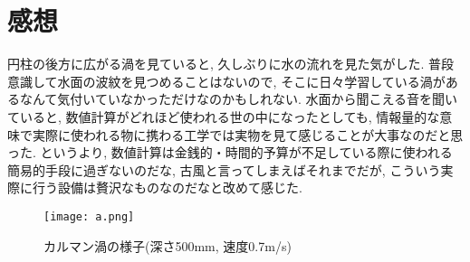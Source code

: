\documentclass[12pt]{jsarticle}
\begin{document}
\section{感想}
円柱の後方に広がる渦を見ていると, 久しぶりに水の流れを見た気がした. 普段意識して水面の波紋を見つめることはないので, そこに日々学習している渦があるなんて気付いていなかっただけなのかもしれない. 水面から聞こえる音を聞いていると, 数値計算がどれほど使われる世の中になったとしても, 情報量的な意味で実際に使われる物に携わる工学では実物を見て感じることが大事なのだと思った. というより, 数値計算は金銭的・時間的予算が不足している際に使われる簡易的手段に過ぎないのだな, 古風と言ってしまえばそれまでだが, こういう実際に行う設備は贅沢なものなのだなと改めて感じた.
\begin{figure}[htbp]
\begin{center}
\texttt{[image: a.png]}
\caption{カルマン渦の様子(深さ500mm, 速度0.7m/s)}
\label{a}
\end{center}
\end{figure}
\end{document}
